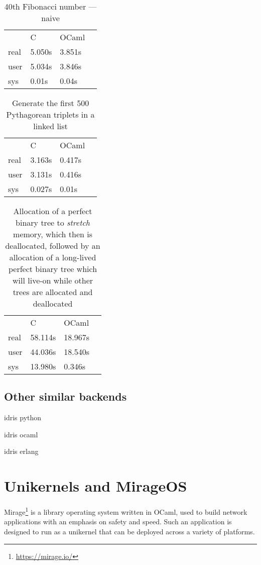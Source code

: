 \begin{table}
    \centering
    \caption{40th Fibonacci number --- naive}
    \begin{tabular}{llll}\label{tab:fibtab}
             & C      & OCaml  & \\
        real & 5.050s & 3.851s & \\
        user & 5.034s & 3.846s & \\
        sys  & 0.01s  & 0.04s  &
    \end{tabular}
\end{table}

\begin{table}
    \centering
    \caption{Generate the first 500 Pythagorean triplets in a linked list}
    \begin{tabular}{llll}\label{tab:pythagtab}
             & C      & OCaml  & \\
        real & 3.163s & 0.417s & \\
        user & 3.131s & 0.416s & \\
        sys  & 0.027s & 0.01s  &
    \end{tabular}
\end{table}


\begin{table}
    \centering
    \caption{Allocation of a perfect binary tree to \emph{stretch} memory, which then is deallocated, followed by an allocation of a long-lived perfect binary tree which will live-on while other trees are allocated and deallocated}
    \begin{tabular}{llll}\label{tab:bintreetab}
             & C       & OCaml   & \\
        real & 58.114s & 18.967s & \\
        user & 44.036s & 18.540s & \\
        sys  & 13.980s & 0.346s  &
    \end{tabular}
\end{table}

\subsection{Other similar backends}
idris python

idris ocaml

idris erlang


\section{Unikernels and MirageOS}\label{sec:mirage}
Mirage\footnote{\url{https://mirage.io/}} is a library operating system written in OCaml, used to build network
applications with an emphasis on safety and speed.
Such an application is designed to run as a unikernel that can be
deployed across a variety of platforms.

